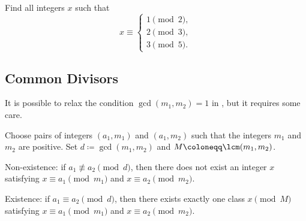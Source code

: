 \documentclass{article}
\begin{document}
\begin{exe}
	Find all integers $x$ such that
	\[x\equiv\begin{cases}
		1\pmod2, \\
		2\pmod3, \\
		3\pmod5.
	\end{cases}\]
\end{exe}

\subsection{Common Divisors}
It is possible to relax the condition $\gcd(m_1,m_2)=1$ in , but it requires some care.
\begin{theorem} \label{thm:crt-no-coprime}
	Choose pairs of integers $(a_1,m_1)$ and $(a_1,m_2)$ such that the integers $m_1$ and $m_2$ are positive. Set $d\coloneqq\gcd(m_1,m_2)$ and $M\coloneqq\lcm(m_1,m_2)$.
	\begin{listalph}
		\item Non-existence: if $a_1\not\equiv a_2\pmod d$, then there does not exist an integer $x$ satisfying $x\equiv a_1\pmod{m_1}$ and $x\equiv a_2\pmod{m_2}$.
		\item Existence: if $a_1\equiv a_2\pmod d$, then there exists exactly one class $x\pmod{M}$ satisfying $x\equiv a_1\pmod{m_1}$ and $x\equiv a_2\pmod{m_2}$.
	\end{listalph}
\end{theorem}
\end{document}
